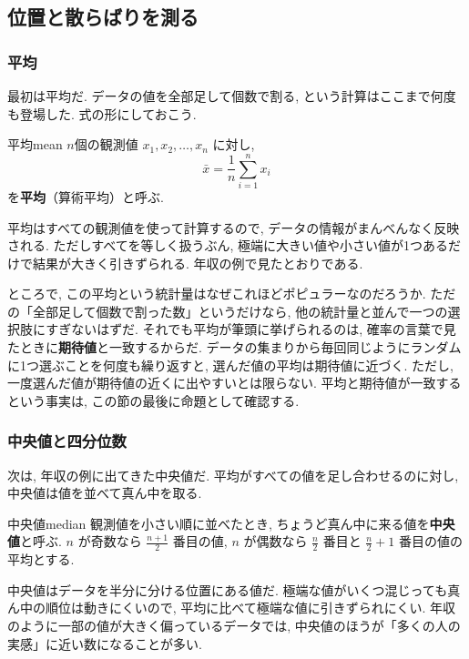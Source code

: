   \subsection{位置と散らばりを測る}

    \subsubsection*{平均}

    最初は平均だ.
    データの値を全部足して個数で割る, という計算はここまで何度も登場した.
    式の形にしておこう.

    \begin{defi}{平均}{mean}
      $n$個の観測値 $x_1, x_2, \ldots, x_n$ に対し,
      \[
        \bar{x} = \frac{1}{n} \sum_{i=1}^{n} x_i
      \]
      を\textbf{平均}（算術平均）と呼ぶ.
    \end{defi}

    平均はすべての観測値を使って計算するので, データの情報がまんべんなく反映される.
    ただしすべてを等しく扱うぶん, 極端に大きい値や小さい値が1つあるだけで結果が大きく引きずられる.
    年収の例で見たとおりである.

    ところで, この平均という統計量はなぜこれほどポピュラーなのだろうか.
    ただの「全部足して個数で割った数」というだけなら, 他の統計量と並んで一つの選択肢にすぎないはずだ.
    それでも平均が筆頭に挙げられるのは, 確率の言葉で見たときに\textbf{期待値}と一致するからだ.
    データの集まりから毎回同じようにランダムに1つ選ぶことを何度も繰り返すと, 選んだ値の平均は期待値に近づく.
    ただし, 一度選んだ値が期待値の近くに出やすいとは限らない.
    平均と期待値が一致するという事実は, この節の最後に命題として確認する.

    \subsubsection*{中央値と四分位数}

    次は, 年収の例に出てきた中央値だ.
    平均がすべての値を足し合わせるのに対し, 中央値は値を並べて真ん中を取る.

    \begin{defi}{中央値}{median}
      観測値を小さい順に並べたとき, ちょうど真ん中に来る値を\textbf{中央値}と呼ぶ.
      $n$ が奇数なら $\frac{n+1}{2}$ 番目の値,
      $n$ が偶数なら $\frac{n}{2}$ 番目と $\frac{n}{2}+1$ 番目の値の平均とする.
    \end{defi}

    中央値はデータを半分に分ける位置にある値だ.
    極端な値がいくつ混じっても真ん中の順位は動きにくいので, 平均に比べて極端な値に引きずられにくい.
    年収のように一部の値が大きく偏っているデータでは, 中央値のほうが「多くの人の実感」に近い数になることが多い.

